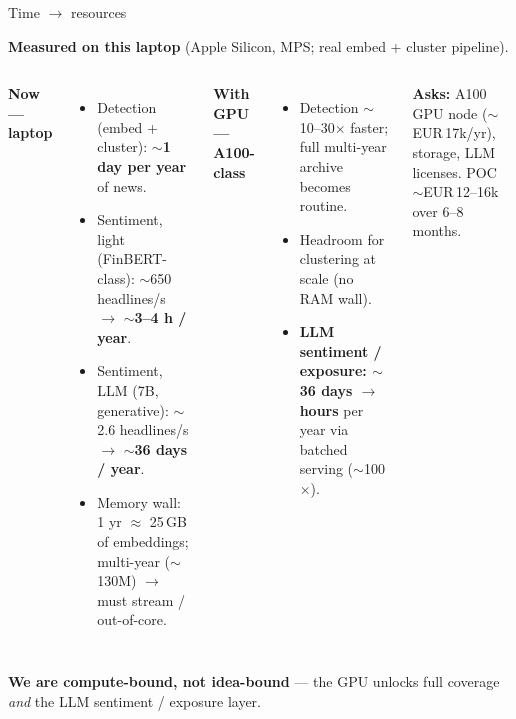 \documentclass[10pt,aspectratio=169]{beamer}
\begin{document}
\begin{frame}{Time $\rightarrow$ resources}
  \footnotesize

  \textbf{Measured on this laptop} \textcolor{black!55}{\scriptsize (Apple Silicon, MPS;
  real embed + cluster pipeline)}.

  \begin{columns}[T,onlytextwidth]
      \textbf{\textcolor{corpblue}{Now --- laptop}}
      \begin{itemize}\setlength\itemsep{0.04cm}
        \item Detection (embed + cluster):
              \textbf{$\sim$1 day per year} of news.
        \item Sentiment, light \textcolor{black!55}{\scriptsize(FinBERT-class)}:
              $\sim$650 headlines/s $\to$ \textbf{$\sim$3--4 h / year}.
        \item Sentiment, LLM \textcolor{black!55}{\scriptsize(7B, generative)}:
              $\sim$2.6 headlines/s $\to$ \textcolor{bad}{\textbf{$\sim$36 days / year}}.
        \item Memory wall: 1 yr $\approx$ 25\,GB of embeddings;
              multi-year ($\sim$130M) $\to$ must stream / out-of-core.
      \end{itemize}

      \textbf{\textcolor{corpgreen}{With GPU --- A100-class}}
      \begin{itemize}\setlength\itemsep{0.04cm}
        \item Detection $\sim$10--30$\times$ faster;
              full multi-year archive becomes routine.
        \item Headroom for clustering at scale (no RAM wall).
        \item \textbf{LLM sentiment / exposure: $\sim$36 days $\to$ hours}
              per year via batched serving ($\sim$100$\times$).
      \end{itemize}
      \vspace{0.10cm}
      \begin{tcolorbox}[colback=corplight, colframe=corplight,
                        boxrule=0pt, arc=2pt, left=6pt, right=6pt, top=3pt, bottom=3pt]
        \scriptsize
        \textbf{Asks:} A100 GPU node ($\sim$EUR\,17k/yr), storage,
        LLM licenses. POC $\sim$EUR\,12--16k over 6--8 months.
      \end{tcolorbox}
  \end{columns}

  \vspace{0.15cm}
  \begin{tcolorbox}[colback=corpblue!8, colframe=corpblue,
                    boxrule=0.4pt, arc=2pt, left=8pt, right=8pt, top=4pt, bottom=4pt]
    \centering\footnotesize
    \textbf{We are compute-bound, not idea-bound} --- the GPU unlocks full
    coverage \emph{and} the LLM sentiment / exposure layer.
  \end{tcolorbox}

\end{frame}
\end{document}
